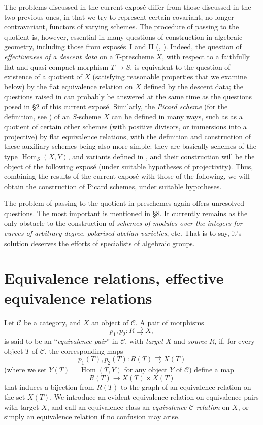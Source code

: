 \documentclass{article}
\renewcommand{\cal}[1]{{\mathcal{#1}}}
\DeclareMathOperator{\Hom}{Hom}
\newcommand{\oldpage}[1]{\marginpar{\footnotesize$\Big\vert$ \textit{p.~#1}}}
\begin{document}
The problems discussed in the current expos\'{e} differ from those discussed in the two previous ones, in that we try to represent certain covariant, no longer contravariant, functors of varying schemes.
The procedure of passing to the quotient is, however, essential in many questions of construction in algebraic geometry, including those from expos\'{e}s~I and II (\cite{1}, \cite{2}).
Indeed, the question of \emph{effectiveness of a descent data} on a $T$-prescheme $X$, with respect to a faithfully flat and quasi-compact morphism $T\to S$, is equivalent to the question of existence of a quotient of $X$ (satisfying reasonable properties that we examine below) by the flat equivalence relation on $X$ defined by the descent data;
the questions raised in \cite[A.2.c]{1} can probably be answered at the same time as the questions posed in \hyperref[2]{\S2} of this current expos\'{e}.
Similarly, the \emph{Picard scheme} (for the definition, see \cite[C.3]{2}) of an $S$-scheme $X$ can be defined in many ways, such as as a quotient of certain other schemes (with positive divisors, or immersions into a projective) by flat equivalence relations, with the definition and construction of these auxiliary schemes being also more simple: they are basically schemes of the type $\Hom_S(X,Y)$, and variants defined in \cite[C.2]{2}, and their construction will be the object of the following expos\'{e} (under suitable hypotheses of projectivity).
Thus, combining the results of the current expos\'{e} with those of the following, we will obtain the construction of Picard schemes, under suitable hypotheses.

The problem of passing to the quotient in preschemes again offers unresolved questions.
The most important is mentioned in \hyperref[8]{\S8}.
It currently remains as the only obstacle to the construction of \emph{schemes of modules over the integers for curves of arbitrary degree}, \emph{polarised abelian varieties}, etc.
That is to say, it's solution deserves the efforts of specialists of algebraic groups.


\oldpage{212-02}
\section{Equivalence relations, effective equivalence relations}

Let $\cal{C}$ be a category, and $X$ an object of $\cal{C}$.
A pair of morphisms
\[
  p_1,p_2\colon R\rightrightarrows X,
\]
is said to be an ``\emph{equivalence pair}'' in $\cal{C}$, with \emph{target} $X$ and \emph{source} $R$, if, for every object $T$ of $\cal{C}$, the corresponding maps
\[
  p_1(T),p_2(T)\colon R(T)\rightrightarrows X(T)
\]
(where we set $Y(T)=\Hom(T,Y)$ for any object $Y$ of $\cal{C}$) define a map
\[
  R(T)\to X(T)\times X(T)
\]
that induces a bijection from $R(T)$ to the graph of an equivalence relation on the set $X(T)$.
We introduce an evident equivalence relation on equivalence pairs with target $X$, and call an equivalence class an \emph{equivalence $\cal{C}$-relation} on $X$, or simply an equivalence relation if no confusion may arise.
\end{document}
